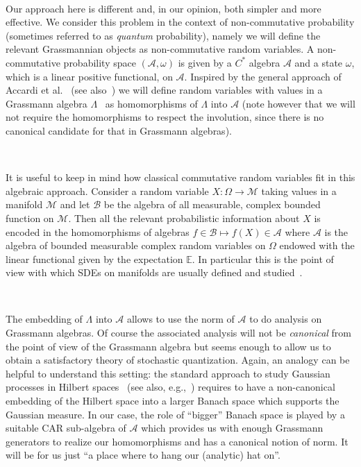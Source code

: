 \documentclass{article}
\newcommand{\tmtextit}[1]{{\itshape{#1}}}
\begin{document}
\

Our approach here is different and, in our opinion, both simpler and more
effective. We consider this problem in the context of non-commutative
probability (sometimes referred to as \tmtextit{quantum} probability), namely
we will define the relevant Grassmannian objects as non-commutative random
variables. A non-commutative probability space $(\mathcal{A}, \omega)$ is
given by a $C^{\ast}$ algebra $\mathcal{A}$ and a state $\omega$, which is a
linear positive functional, on $\mathcal{A}$. Inspired by the general approach
of Accardi et al.~{\cite{accardi_quantum_1982}} (see
also~{\cite{accardi_outline_2015}}) we will define random variables with
values in a Grassmann algebra $\Lambda$ \ as homomorphisms of $\Lambda$ into
$\mathcal{A}$ (note however that we will not require the homomorphisms to
respect the involution, since there is no canonical candidate for that in
Grassmann algebras).

\

It is useful to keep in mind how classical commutative random variables fit
in this algebraic approach. Consider a random variable $X : \Omega \rightarrow
\mathcal{M}$ taking values in a manifold $\mathcal{M}$ and let $\mathcal{B}$
be the algebra of all measurable, complex bounded function on $\mathcal{M}$.
Then all the relevant probabilistic information about $X$ is encoded in the
homomorphisms of algebras $f \in \mathcal{B} \mapsto f (X) \in \mathcal{A}$
where $\mathcal{A}$ is the algebra of bounded measurable complex random
variables on $\Omega$ endowed with the linear functional given by the
expectation $\mathbb{E}$. In particular this is the point of view with which
SDEs on manifolds are usually defined and
studied~{\cite{hsu_stochastic_2002}}.

\

The embedding of $\Lambda$ into $\mathcal{A}$ allows to use the norm of
$\mathcal{A}$ to do analysis on Grassmann algebras. Of course the associated
analysis will not be \tmtextit{canonical} from the point of view of the
Grassmann algebra but seems enough to allow us to obtain a satisfactory theory
of stochastic quantization. Again, an analogy can be helpful to understand
this setting: the standard approach to study Gaussian processes in Hilbert
spaces~{\cite{Gross1967}} (see also, e.g.,~{\cite{janson_gaussian_1997}})
requires to have a non-canonical embedding of the Hilbert space into a larger
Banach space which supports the Gaussian measure. In our case, the role of
``bigger'' Banach space is played by a suitable CAR sub-algebra of
$\mathcal{A}$ which provides us with enough Grassmann generators to realize
our homomorphisms and has a canonical notion of norm. It will be for us just
``a place where to hang our (analytic) hat on''. \ \
\end{document}
